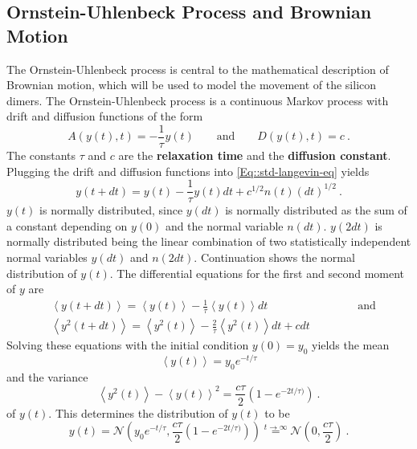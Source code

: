 	
	\subsection{Ornstein-Uhlenbeck Process and Brownian Motion} \label{Section::Brownian-Motion}
	The Ornstein-Uhlenbeck process is central to the mathematical description of Brownian motion, which will be used to model the movement of the silicon dimers. The Ornstein-Uhlenbeck process is a continuous Markov process with drift and diffusion functions of the form
	\begin{equation}
		A(y(t), t) =	- \frac{1}{\tau} y(t) \qquad \text{and} \qquad D(y(t), t) =	c~.
	\end{equation}
	The constants $\tau$ and $c$ are the \textbf{relaxation time} and the \textbf{diffusion constant}. Plugging the drift and diffusion functions into \autoref{Eq::std-langevin-eq} yields
	\begin{equation}\label{Eq::OU-Langevin}
		y(t + dt) =	y(t) - \frac{1}{\tau} y(t) dt + c^{1/2} n(t) (dt)^{1/2}~.
	\end{equation}
	$y(t)$ is normally distributed, since $y(dt)$ is normally distributed as the sum of a constant depending on $y(0)$ and the normal variable $n(dt)$. $y(2dt)$ is normally distributed being the linear combination of two statistically independent normal variables $y(dt)$ and $n(2dt)$. Continuation shows the normal distribution of $y(t)$.
	The differential equations for the first and second moment of $y$ are
	\begin{align}
		&\left \langle y(t + dt) \right \rangle =	\left \langle y(t) \right \rangle - \frac{1}{\tau} \left \langle y(t) \right \rangle dt \qquad \qquad \qquad \qquad  \text{and} \\
		&\left \langle y^2(t + dt) \right \rangle =	\left \langle y^2(t) \right \rangle - \frac{2}{\tau} \left \langle y^2(t) \right \rangle dt  + c dt
	\end{align}
	Solving these equations with the initial condition $y(0) =	y_0$ yields the mean
	\begin{equation}
		\left \langle y(t) \right \rangle =	 y_0 e^{-t/\tau}
	\end{equation}
	and the variance
	\begin{equation}
		\left \langle y^2(t) \right \rangle - \left \langle y(t) \right \rangle^2 =	\frac{c\tau}{2} \left(1 - e^{-2t /	\tau)}\right)~.
	\end{equation}
	of $y(t)$. This determines the distribution of $y(t)$ to be
	\begin{equation} \label{Eq::OU-Distribution}
		y(t) =	\mathcal{N}\left(y_0 e^{-t/\tau}, \frac{c\tau}{2} \left(1 - e^{-2t /	\tau)}\right)\right) \overset{t \rightarrow \infty}{=} \mathcal{N}\left(0 , \frac{c\tau}{2}\right) ~.
	\end{equation}
